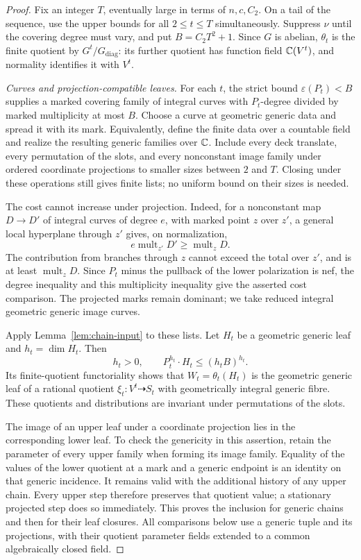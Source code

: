 \begin{proof}
Fix an integer $T$, eventually large in terms of $n,c,C_2$.
On a tail of the sequence, use the upper bounds for all
$2\le t\le T$ simultaneously. Suppress $\nu$ until the covering
degree must vary, and put $B=C_2T^2+1$.
Since $G$ is abelian, $\theta_t$ is the finite quotient by
$G^t/G_{\mathrm{diag}}$: its further quotient has function field
$\mathbb C(V^t)$, and normality identifies it with $V^t$.

\medskip\noindent\emph{Curves and projection-compatible leaves.}
For each $t$, the strict bound $\varepsilon(P_t)<B$ supplies a
marked covering family of integral curves with
$P_t$-degree divided by marked multiplicity at most $B$.
Choose a curve at geometric generic data and spread it with its
mark. Equivalently, define the finite data over a countable field
and realize the resulting generic families over $\mathbb C$.
Include every deck translate, every permutation of the slots,
and every nonconstant image family under ordered coordinate
projections to smaller sizes between $2$ and $T$. Closing under
these operations still gives finite lists; no uniform bound on
their sizes is needed.

The cost cannot increase under projection. Indeed, for a
nonconstant map $D\to D'$ of integral curves of degree $e$,
with marked point $z$ over $z'$, a general local hyperplane
through $z'$ gives, on normalization,
\[
 e\operatorname{mult}_{z'}D'\ge\operatorname{mult}_zD.
\]
The contribution from branches through $z$ cannot exceed the
total over $z'$, and is at least $\operatorname{mult}_zD$.
Since $P_t$ minus the pullback of the lower polarization is nef,
the degree inequality and this multiplicity inequality give the
asserted cost comparison. The projected marks remain dominant;
we take reduced integral geometric generic image curves.

Apply Lemma~\ref{lem:chain-input} to these lists.
Let $H_t$ be a geometric generic leaf and $h_t=\dim H_t$.
Then
\begin{equation}\label{eq:transport-chain-degree-new}
 h_t>0,\qquad P_t^{h_t}\cdot H_t\le(h_tB)^{h_t}.
\end{equation}
Its finite-quotient functoriality shows that
$W_t=\theta_t(H_t)$ is the geometric generic leaf
of a rational quotient
$\xi_t:V^t\dashrightarrow S_t$ with geometrically integral
generic fibre. These quotients and distributions are invariant
under permutations of the slots.

The image of an upper leaf under a coordinate projection lies
in the corresponding lower leaf. To check the genericity in
this assertion, retain the parameter of every upper family when
forming its image family. Equality of the values of the lower quotient
at a mark and a generic endpoint is an identity on that generic
incidence. It remains valid with the additional history of any
upper chain. Every upper step therefore preserves that quotient value;
a stationary projected step does so immediately. This proves
the inclusion for generic chains and then for their leaf closures.
All comparisons below use a generic tuple and its projections,
with their quotient parameter fields extended to a common
algebraically closed field.


\end{proof}
